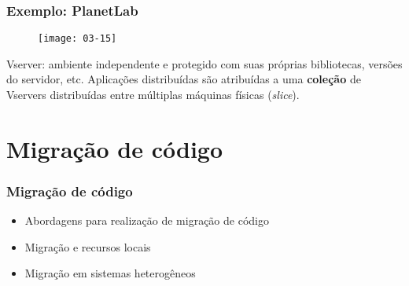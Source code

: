 \documentclass[Ligatures=TeX,table,brazil,svgnames,usetotalslideindicator,compress,10pt]{beamer}
\begin{document}
\begin{frame}
  \frametitle{Exemplo: PlanetLab}

  \begin{figure}
    \centering
    \texttt{[image: 03-15]}
  \end{figure}

  \begin{block}{}
    \alert{Vserver:} ambiente independente e protegido com suas
    próprias bibliotecas, versões do servidor, etc. Aplicações
    distribuídas são atribuídas a uma \textbf{coleção} de Vservers
    \alert{distribuídas entre múltiplas máquinas físicas}
    (\textit{slice}).
  \end{block}

\end{frame}

\section{Migração de código}

\begin{frame}
  \frametitle{Migração de código}
  \begin{itemize}
  \item Abordagens para realização de migração de código
  \item Migração e recursos locais
  \item Migração em sistemas heterogêneos
  \end{itemize}
\end{frame}

\newcommand{\STACK}[3]{%
  \framebox[1.6cm]{%
    \begin{minipage}{1.55cm}
      \begin{center}
        \framebox[1.5cm]{\rule{0pt}{0.6em}{#1}} \\
        \framebox[1.5cm]{\rule{0pt}{0.6em}{#2}} \\
        \framebox[1.5cm]{\rule{0pt}{0.6em}{#3}} \\
      \end{center}
    \end{minipage}}}
\end{document}
